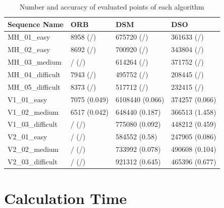 	\begin{table}
	\caption{Number and accuracy of evaluated points of each algorithm}
	\begin{tabular}{ |p{3cm}||p{3cm}|p{3cm}|p{3cm}|  }
	\hline
	Sequence Name& ORB & DSM & DSO \\
	\hline
	MH\_01\_easy & 8958 (/) & 675720 (/) & 361633 (/)\\
	MH\_02\_easy & 8692 (/) & 700920 (/) & 343804 (/)\\
	MH\_03\_medium & / (/) & 614264 (/) & 371752 (/)\\
	MH\_04\_difficult & 7943 (/) & 495752 (/) & 208445 (/)\\
	MH\_05\_difficult & 8373 (/) & 517712 (/) & 232415 (/)\\
	V1\_01\_easy & 7075 (0.049) & 6108440 (0.066) & 374257 (0.066)\\
	V1\_02\_medium & 6517 (0.042) & 648440 (0.187) & 366513 (1.458)\\
	V1\_03\_difficult & / (/) & 775080 (0.092) & 448212 (0.459)\\
	V2\_01\_easy & / (/) & 584552 (0.58) & 247905 (0.086)\\
	V2\_02\_medium & / (/)& 733992 (0.078) & 490608 (0.104)\\
	V2\_03\_difficult & / (/) & 921312 (0.645) & 465396 (0.677)\\
	\hline
	\end{tabular}
	\label{table:pointcloud}
	\end{table}
	
	
	
	

\section{Calculation Time}

